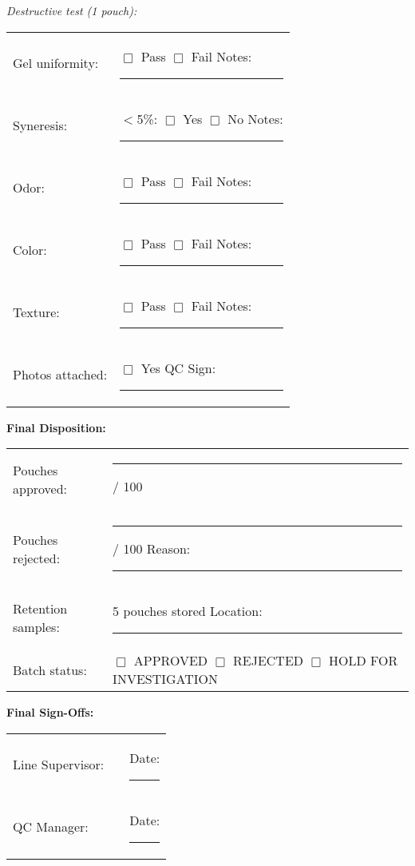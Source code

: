 {\vspace{0.5em}

\noindent\textit{Destructive test (1 pouch):}

\begin{tabular}{@{}lp{8cm}@{}}
Gel uniformity: & $\Box$ Pass $\Box$ Fail \hspace{2cm} Notes: \rule{5cm}{0.4pt} \\
Syneresis: & $<$5\%: $\Box$ Yes $\Box$ No \hspace{2cm} Notes: \rule{5cm}{0.4pt} \\
Odor: & $\Box$ Pass $\Box$ Fail \hspace{2cm} Notes: \rule{5cm}{0.4pt} \\
Color: & $\Box$ Pass $\Box$ Fail \hspace{2cm} Notes: \rule{5cm}{0.4pt} \\
Texture: & $\Box$ Pass $\Box$ Fail \hspace{2cm} Notes: \rule{5cm}{0.4pt} \\
Photos attached: & $\Box$ Yes \hspace{3cm} QC Sign: \rule{3cm}{0.4pt} \\
\end{tabular}

\vspace{1em}

\noindent\textbf{Final Disposition:}

\begin{tabular}{@{}lp{8cm}@{}}
Pouches approved: & \rule{3cm}{0.4pt} / 100 \\
Pouches rejected: & \rule{3cm}{0.4pt} / 100 \hspace{2cm} Reason: \rule{5cm}{0.4pt} \\
Retention samples: & 5 pouches stored \hspace{2cm} Location: \rule{4cm}{0.4pt} \\
Batch status: & $\Box$ APPROVED $\Box$ REJECTED $\Box$ HOLD FOR INVESTIGATION \\
\end{tabular}

\vspace{1em}

\noindent\textbf{Final Sign-Offs:}

\begin{tabular}{@{}lp{5cm}p{5cm}@{}}
Line Supervisor: & \rule{4cm}{0.4pt} & Date: \rule{3cm}{0.4pt} \\
QC Manager: & \rule{4cm}{0.4pt} & Date: \rule{3cm}{0.4pt} \\
\end{tabular}

}
